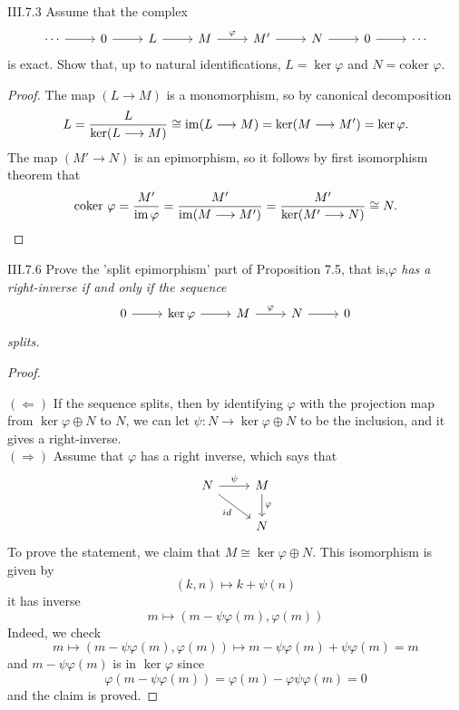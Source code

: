 \begin{problem}{III.7.3}
Assume that the complex
\[
\begin{tikzcd}
\cdots \arrow[r] & 0 \arrow[r] & L \arrow[r] & M \arrow[r, "\varphi"] & M' \arrow[r] & N \arrow[r] & 0 \arrow[r] & \cdots
\end{tikzcd}
\]
is exact. Show that, up to natural identifications, $L = \ker \varphi$ and $N = \text{coker }\varphi$.
\end{problem}
\begin{proof}
The map $(L \longrightarrow M)$ is a monomorphism, so by canonical decomposition
\[
L = \frac{L}{\ker (L \longrightarrow M)} \cong \operatorname{im}(L \longrightarrow M) = \ker (M \longrightarrow M') = \ker \varphi.
\]
The map $(M' \longrightarrow N)$ is an epimorphism, so it follows by first isomorphism theorem that
\[
\text{coker }\varphi=\frac{M'}{\operatorname{im} \varphi}=\frac{M'}{\operatorname{im}(M \longrightarrow M')}= \frac{M'}{\ker(M' \longrightarrow N)} \cong N.
\]
\end{proof}

\begin{problem}{III.7.6}
Prove the 'split epimorphism' part of Proposition 7.5, that is,\emph{$\varphi$ has a right-inverse if and only if the sequence}
\[
\begin{tikzcd}
0 \arrow[r] & \ker \varphi \arrow[r] & M \arrow[r, "\varphi"] & N \arrow[r] & 0
\end{tikzcd}
\]
\emph{splits.}
\end{problem}
\begin{proof} \

\noindent $(\Leftarrow)$ If the sequence splits, then by identifying $\varphi$ with the projection map from $\ker \varphi \oplus N$ to $N$, we can let $\psi : N \to \ker \varphi \oplus N $ to be the inclusion, and it gives a right-inverse. \\
$(\Rightarrow)$ Assume that $\varphi$ has a right inverse, which says that
\[
\begin{tikzcd}
N \arrow[r, "\psi"] \arrow[rd, "id"'] & M \arrow[d, "\varphi"] \\
& N
\end{tikzcd}
\]
To prove the statement, we claim that $M \cong \ker \varphi \oplus N$. This isomorphism is given by
\[
(k,n) \mapsto k + \psi (n)
\]
it has inverse
\[
m \mapsto (m-\psi\varphi(m), \varphi(m))
\]
Indeed, we check
\[
m \mapsto (m-\psi\varphi(m), \varphi(m)) \mapsto m-\psi\varphi(m) + \psi\varphi(m) = m
\]
and $m-\psi\varphi(m)$ is in $\ker \varphi$ since
\[
\varphi(m-\psi\varphi(m)) = \varphi(m) - \varphi\psi\varphi(m) = 0
\]
and the claim is proved.
\end{proof}


